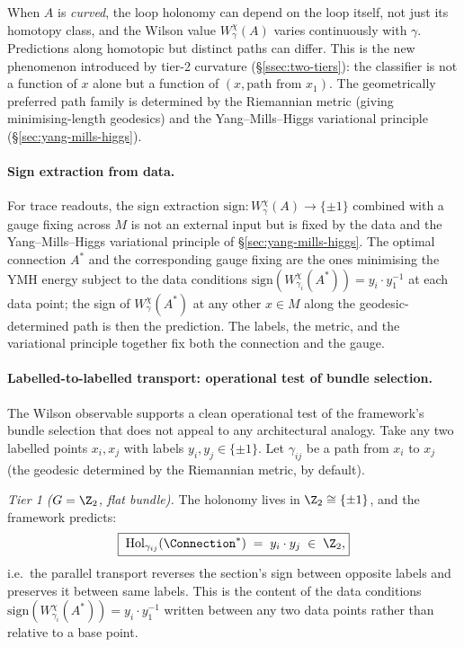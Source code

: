 When $A$ is \emph{curved}, the loop holonomy can depend on the loop
itself, not just its homotopy class, and the Wilson value
$W_\gamma^\chi(A)$ varies continuously with $\gamma$. Predictions
along homotopic but distinct paths can differ. This is the new
phenomenon introduced by tier-2 curvature
(\S\ref{ssec:two-tiers}): the classifier is not a function of $x$
alone but a function of $(x,\text{path from }x_1)$. The geometrically
preferred path family is determined by the Riemannian metric (giving
minimising-length geodesics) and the Yang--Mills--Higgs variational
principle (\S\ref{sec:yang-mills-higgs}).

\paragraph{Sign extraction from data.} For trace readouts, the sign
extraction $\mathrm{sign}\colon W_\gamma^\chi(A)\to\{\pm 1\}$
combined with a gauge fixing across $M$ is not an external input
but is fixed by the data and the Yang--Mills--Higgs variational
principle of \S\ref{sec:yang-mills-higgs}. The optimal connection
$A^*$ and the corresponding gauge fixing are the ones minimising
the YMH energy subject to the data conditions
$\mathrm{sign}(W_{\gamma_i}^\chi(A^*))=y_i\cdot y_1^{-1}$ at each
data point; the sign of $W_\gamma^\chi(A^*)$ at any other $x\in M$
along the geodesic-determined path is then the prediction. The
labels, the metric, and the variational principle together fix
both the connection and the gauge.

\paragraph{Labelled-to-labelled transport: operational test of
bundle selection.} The Wilson observable supports a clean
operational test of the framework's bundle selection that does not
appeal to any architectural analogy. Take any two labelled points
$x_i, x_j$ with labels $y_i, y_j\in\{\pm 1\}$. Let $\gamma_{ij}$ be
a path from $x_i$ to $x_j$ (the geodesic determined by the
Riemannian metric, by default).

\emph{Tier 1 ($G=\Z_2$, flat bundle).} The holonomy lives in
$\Z_2\cong\{\pm 1\}$, and the framework predicts:
\[
   \boxed{\;\mathrm{Hol}_{\gamma_{ij}}(\Connection^*)
   \;=\; y_i\cdot y_j\;\in\;\Z_2,}
\]
i.e.\ the parallel transport reverses the section's sign between
opposite labels and preserves it between same labels. This is the
content of the data conditions
$\mathrm{sign}(W_{\gamma_i}^\chi(A^*))=y_i\cdot y_1^{-1}$ written
between any two data points rather than relative to a base point.

